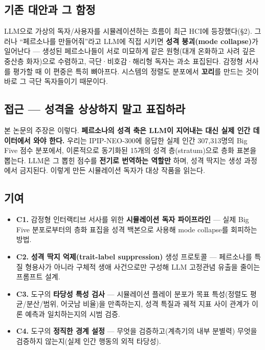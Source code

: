 \documentclass[11pt, a4paper]{article}
\begin{document}
\subsection{기존 대안과 그 함정}

LLM으로 가상의 독자/사용자를 시뮬레이션하는 흐름이 최근 HCI에 등장했다(\S2). 그러나 ``페르소나를 만들어줘''라고 LLM에 직접 시키면 \textbf{성격 붕괴(mode collapse)}가 일어난다 --- 생성된 페르소나들이 서로 미묘하게 같은 원형(대개 온화하고 사려 깊은 중산층 화자)으로 수렴하고, 극단·비호감·해리형 독자는 과소 표집된다. 감정형 서사를 평가할 때 이 편중은 특히 뼈아프다. 시스템의 정렬도 분포에서 \textbf{꼬리}를 만드는 것이 바로 그 극단 독자들이기 때문이다.

\subsection{접근 --- 성격을 상상하지 말고 표집하라}

본 논문의 주장은 이렇다. \textbf{페르소나의 성격 축은 LLM이 지어내는 대신 실제 인간 데이터에서 와야 한다.} 우리는 IPIP-NEO-300에 응답한 실제 인간 307{,}313명의 Big Five 점수 분포에서, 이론적으로 동기화된 15개의 성격 층(stratum)으로 층화 표본을 뽑는다. LLM은 그 뽑힌 점수를 \textbf{전기로 번역하는 역할만} 하며, 성격 딱지는 생성 과정에서 금지된다. 이렇게 만든 시뮬레이션 독자가 대상 작품을 읽는다.

\subsection{기여}

\begin{itemize}
  \item \textbf{C1.} 감정형 인터랙티브 서사를 위한 \textbf{시뮬레이션 독자 파이프라인} --- 실제 Big Five 분포로부터의 층화 표집을 성격 백본으로 사용해 mode collapse를 회피하는 방법.
  \item \textbf{C2.} \textbf{성격 딱지 억제(trait-label suppression)} 생성 프로토콜 --- 페르소나를 특질 형용사가 아니라 구체적 생애 사건으로만 구성해 LLM 고정관념 유출을 줄이는 프롬프트 설계.
  \item \textbf{C3.} 도구의 \textbf{타당성 특성 검사} --- 시뮬레이션 플레이 분포가 목표 특성(정렬도 평균/분산/범위, 어긋남 비율)을 만족하는지, 성격 특질과 궤적 지표 사이 관계가 이론 예측과 일치하는지의 시범 검증.
  \item \textbf{C4.} 도구의 \textbf{정직한 경계 설정} --- 무엇을 검증하고(계측기의 내부 분별력) 무엇을 검증하지 않는지(실제 인간 행동의 외적 타당성).
\end{itemize}
\end{document}
